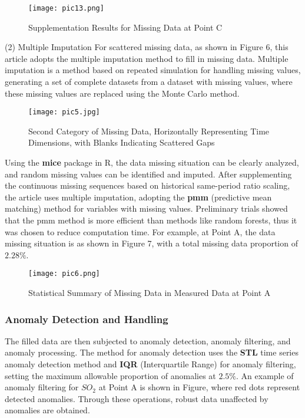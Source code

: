 \documentclass[12pt]{article}
\begin{document}
\begin{figure}[H]
	\caption{Supplementation Results for Missing Data at Point C}
	\label{pic13}
	\centering
	\texttt{[image: pic13.png]}
\end{figure}

(2) Multiple Imputation
For scattered missing data, as shown in Figure 6, this article adopts the multiple imputation method to fill in missing data. Multiple imputation is a method based on repeated simulation for handling missing values, generating a set of complete datasets from a dataset with missing values, where these missing values are replaced using the Monte Carlo method.

\begin{figure}[H]
	\caption{Second Category of Missing Data, Horizontally Representing Time Dimensions, with Blanks Indicating Scattered Gaps}
	\label{pic5}
	\centering
	\texttt{[image: pic5.jpg]}
\end{figure}


Using the \textbf{mice} package in R, the data missing situation can be clearly analyzed, and random missing values can be identified and imputed. After supplementing the continuous missing sequences based on historical same-period ratio scaling, the article uses multiple imputation, adopting the \textbf{pmm} (predictive mean matching) method for variables with missing values. Preliminary trials showed that the pmm method is more efficient than methods like random forests, thus it was chosen to reduce computation time. For example, at Point A, the data missing situation is as shown in Figure 7, with a total missing data proportion of $2.28\%$.

\begin{figure}[H]
	\caption{Statistical Summary of Missing Data in Measured Data at Point A}
	\label{pic6}
	\centering
	\texttt{[image: pic6.png]}
\end{figure}

\subsubsection{Anomaly Detection and Handling}
The filled data are then subjected to anomaly detection, anomaly filtering, and anomaly processing. The method for anomaly detection uses the \textbf{STL} time series anomaly detection method and \textbf{IQR} (Interquartile Range) for anomaly filtering, setting the maximum allowable proportion of anomalies at $2.5\%$. An example of anomaly filtering for $SO_2$ at Point A is shown in Figure, where red dots represent detected anomalies. Through these operations, robust data unaffected by anomalies are obtained.
\end{document}
